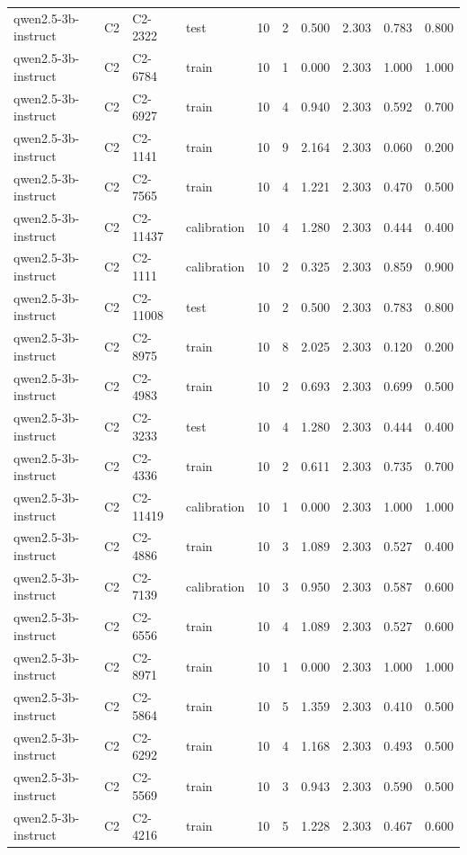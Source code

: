 \begin{table}
\begin{tabular}{llllrrrrrr}
qwen2.5-3b-instruct & C2 & C2-2322 & test & 10 & 2 & 0.500 & 2.303 & 0.783 & 0.800 \\
qwen2.5-3b-instruct & C2 & C2-6784 & train & 10 & 1 & 0.000 & 2.303 & 1.000 & 1.000 \\
qwen2.5-3b-instruct & C2 & C2-6927 & train & 10 & 4 & 0.940 & 2.303 & 0.592 & 0.700 \\
qwen2.5-3b-instruct & C2 & C2-1141 & train & 10 & 9 & 2.164 & 2.303 & 0.060 & 0.200 \\
qwen2.5-3b-instruct & C2 & C2-7565 & train & 10 & 4 & 1.221 & 2.303 & 0.470 & 0.500 \\
qwen2.5-3b-instruct & C2 & C2-11437 & calibration & 10 & 4 & 1.280 & 2.303 & 0.444 & 0.400 \\
qwen2.5-3b-instruct & C2 & C2-1111 & calibration & 10 & 2 & 0.325 & 2.303 & 0.859 & 0.900 \\
qwen2.5-3b-instruct & C2 & C2-11008 & test & 10 & 2 & 0.500 & 2.303 & 0.783 & 0.800 \\
qwen2.5-3b-instruct & C2 & C2-8975 & train & 10 & 8 & 2.025 & 2.303 & 0.120 & 0.200 \\
qwen2.5-3b-instruct & C2 & C2-4983 & train & 10 & 2 & 0.693 & 2.303 & 0.699 & 0.500 \\
qwen2.5-3b-instruct & C2 & C2-3233 & test & 10 & 4 & 1.280 & 2.303 & 0.444 & 0.400 \\
qwen2.5-3b-instruct & C2 & C2-4336 & train & 10 & 2 & 0.611 & 2.303 & 0.735 & 0.700 \\
qwen2.5-3b-instruct & C2 & C2-11419 & calibration & 10 & 1 & 0.000 & 2.303 & 1.000 & 1.000 \\
qwen2.5-3b-instruct & C2 & C2-4886 & train & 10 & 3 & 1.089 & 2.303 & 0.527 & 0.400 \\
qwen2.5-3b-instruct & C2 & C2-7139 & calibration & 10 & 3 & 0.950 & 2.303 & 0.587 & 0.600 \\
qwen2.5-3b-instruct & C2 & C2-6556 & train & 10 & 4 & 1.089 & 2.303 & 0.527 & 0.600 \\
qwen2.5-3b-instruct & C2 & C2-8971 & train & 10 & 1 & 0.000 & 2.303 & 1.000 & 1.000 \\
qwen2.5-3b-instruct & C2 & C2-5864 & train & 10 & 5 & 1.359 & 2.303 & 0.410 & 0.500 \\
qwen2.5-3b-instruct & C2 & C2-6292 & train & 10 & 4 & 1.168 & 2.303 & 0.493 & 0.500 \\
qwen2.5-3b-instruct & C2 & C2-5569 & train & 10 & 3 & 0.943 & 2.303 & 0.590 & 0.500 \\
qwen2.5-3b-instruct & C2 & C2-4216 & train & 10 & 5 & 1.228 & 2.303 & 0.467 & 0.600 \\

\end{tabular}
\end{table}

